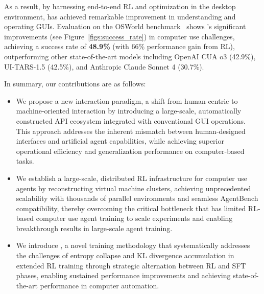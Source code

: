 As a result, by harnessing end-to-end RL and optimization in the desktop environment, \computerrl has achieved remarkable improvement in understanding and operating GUIs. Evaluation on the OSWorld benchmark~\citep{xie2024osworld} shows \computerrl's significant improvements (see Figure~\ref{figs:success_rate}) in computer use challenges, achieving a success rate of \textbf{48.9\%} (with 66\% performance gain from RL), outperforming other state-of-the-art models including OpenAI CUA o3 (42.9\%), UI-TARS-1.5 (42.5\%), and Anthropic Claude Sonnet 4 (30.7\%).


In summary, our contributions are as follows:
\begin{itemize}[leftmargin=*,itemsep=0pt,parsep=0.2em,topsep=0.2em,partopsep=0.0em]
    \item We propose a new interaction paradigm, a shift from human-centric to machine-oriented interaction by introducing a large-scale, automatically constructed API ecosystem integrated with conventional GUI operations. This approach addresses the inherent mismatch between human-designed interfaces and artificial agent capabilities, while achieving superior operational efficiency and generalization performance on computer-based tasks.
    \item We establish a large-scale, distributed RL infrastructure for computer use agents by reconstructing virtual machine clusters, achieving unprecedented scalability with thousands of parallel environments and seamless AgentBench compatibility, thereby overcoming the critical bottleneck that has limited RL-based computer use agent training to scale experiments and enabling breakthrough results in large-scale agent training.
    \item We introduce \rlmethod, a novel training methodology that systematically addresses the challenges of entropy collapse and KL divergence accumulation in extended RL training through strategic alternation between RL and SFT phases, enabling sustained performance improvements and achieving state-of-the-art performance in computer automation.
\end{itemize}